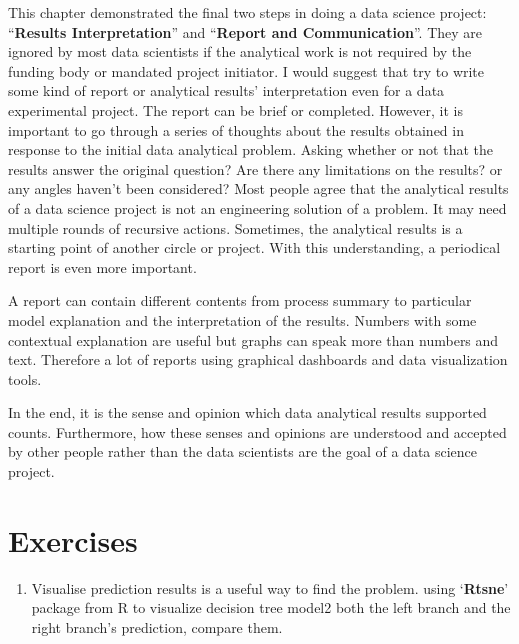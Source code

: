 \documentclass[
]{book}
\providecommand{\tightlist}{%
  \setlength{\itemsep}{0pt}\setlength{\parskip}{0pt}}
\begin{document}
This chapter demonstrated the final two steps in doing a data science project: ``\textbf{Results Interpretation}'' and ``\textbf{Report and Communication}''. They are ignored by most data scientists if the analytical work is not required by the funding body or mandated project initiator. I would suggest that try to write some kind of report or analytical results' interpretation even for a data experimental project. The report can be brief or completed. However, it is important to go through a series of thoughts about the results obtained in response to the initial data analytical problem. Asking whether or not that the results answer the original question? Are there any limitations on the results? or any angles haven't been considered? Most people agree that the analytical results of a data science project is not an engineering solution of a problem. It may need multiple rounds of recursive actions. Sometimes, the analytical results is a starting point of another circle or project. With this understanding, a periodical report is even more important.

A report can contain different contents from process summary to particular model explanation and the interpretation of the results. Numbers with some contextual explanation are useful but graphs can speak more than numbers and text. Therefore a lot of reports using graphical dashboards and data visualization tools.

In the end, it is the sense and opinion which data analytical results supported counts. Furthermore, how these senses and opinions are understood and accepted by other people rather than the data scientists are the goal of a data science project.

\hypertarget{exercises-9}{%
\section*{Exercises}\label{exercises-9}}


\begin{enumerate}
\def\labelenumi{\arabic{enumi}.}
\tightlist
\item
  Visualise prediction results is a useful way to find the problem. using `\textbf{Rtsne}' package from R to visualize decision tree model2 both the left branch and the right branch's prediction, compare them.
\end{enumerate}
\end{document}
